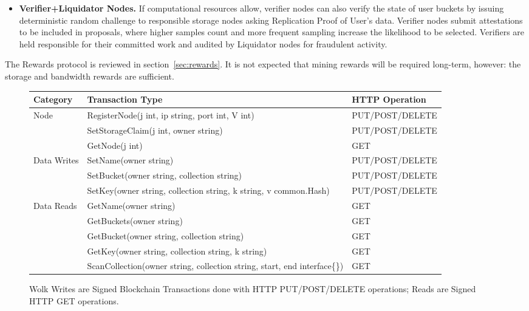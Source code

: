 \documentclass[journal]{IEEEtran}
\newcommand{\tx}[1]{\textsf{#1}}
\begin{document}
\begin{itemize}
\item {\bf Verifier+Liquidator Nodes.}  If computational resources allow, verifier nodes can also verify the state of user buckets by issuing deterministic random challenge to responsible storage nodes asking Replication Proof of User's data. Verifier nodes submit attestations to be included in proposals, where higher samples count and more frequent sampling increase the likelihood to be selected. Verifiers are held responsible for their committed work and audited by Liquidator nodes for fraudulent activity.

\end{itemize}
The Rewards protocol is reviewed in section~\ref{sec:rewards}.  It is not expected that mining rewards will be required long-term, however: the storage and bandwidth rewards are sufficient.

\begin{figure*}[h]
    \centering
\begin{small}
    \begin{tabular}{l|l|l}
    Category & Transaction Type & HTTP Operation \\ \hline \hline
      Node &   \textsf{RegisterNode(j int, ip string, port int, V int)} & PUT/POST/DELETE \\
           & \tx{SetStorageClaim(j int, owner string)} & PUT/POST/DELETE \\
           & \tx{GetNode(j int)} & GET \\  \hline
      Data Writes &   \tx{SetName(owner string})  & PUT/POST/DELETE \\
           & \tx{SetBucket(owner string, collection string)}  & PUT/POST/DELETE \\
           & \tx{SetKey(owner string, collection string, k string, v common.Hash)}  & PUT/POST/DELETE \\ \hline
       Data Reads  & \tx{GetName(owner string)}  & GET \\
       &  \tx{GetBuckets(owner string)}  & GET \\
       &  \tx{GetBucket(owner string, collection string)}  & GET\\
       &  \tx{GetKey(owner string, collection string, k string)}  & GET \\
       &  \tx{ScanCollection(owner string, collection string, start, end interface\{\})}  & GET \\
     \end{tabular}
\end{small}
    \caption{Wolk Writes are Signed Blockchain Transactions done with HTTP PUT/POST/DELETE operations; Reads are Signed HTTP GET operations.}
    \label{fig:transactiontypes}
\end{figure*}
\end{document}
